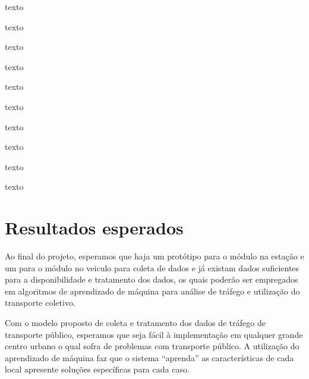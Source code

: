 \documentclass[12pt,cor2018]{uftpibic}
\begin{document}
{\color{white}
texto

texto

texto

texto

texto

texto

texto

texto

texto

texto
}

\chapter{Resultados esperados}

Ao final do projeto, esperamos que haja um protótipo para o módulo na estação e um para o módulo no veiculo para coleta de dados e já existam dados suficientes para a disponibilidade e tratamento dos dados, os quais poderão ser empregados em algoritmos de aprendizado de máquina para análise de tráfego e utilização do transporte coletivo.

Com o modelo proposto de coleta e tratamento dos dados de tráfego de transporte público, esperamos que seja fácil à implementação em qualquer grande centro urbano o qual sofra de problemas com transporte público. A utilização do aprendizado de máquina faz que o sistema ``aprenda'' as características de cada local apresente soluções específicas para cada caso.



\end{document}
